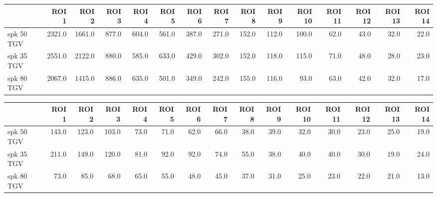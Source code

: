 \begin{tabular}{lrrrrrrrrrrrrrr}
\toprule
{} &   ROI 1 &   ROI 2 &  ROI 3 &  ROI 4 &  ROI 5 &  ROI 6 &  ROI 7 &  ROI 8 &  ROI 9 &  ROI 10 &  ROI 11 &  ROI 12 &  ROI 13 &  ROI 14 \\
\midrule
 spk 50 TGV &  2321.0 &  1661.0 &  877.0 &  604.0 &  561.0 &  387.0 &  271.0 &  152.0 &  112.0 &   100.0 &    62.0 &    43.0 &    32.0 &    22.0 \\
 spk 35 TGV &  2551.0 &  2122.0 &  880.0 &  585.0 &  633.0 &  429.0 &  302.0 &  152.0 &  118.0 &   115.0 &    71.0 &    48.0 &    28.0 &    23.0 \\
 spk 80 TGV &  2067.0 &  1415.0 &  886.0 &  635.0 &  501.0 &  349.0 &  242.0 &  155.0 &  116.0 &    93.0 &    63.0 &    42.0 &    32.0 &    17.0 \\
\bottomrule
\end{tabular}
\begin{tabular}{lrrrrrrrrrrrrrr}
\toprule
{} &  ROI 1 &  ROI 2 &  ROI 3 &  ROI 4 &  ROI 5 &  ROI 6 &  ROI 7 &  ROI 8 &  ROI 9 &  ROI 10 &  ROI 11 &  ROI 12 &  ROI 13 &  ROI 14 \\
\midrule
 spk 50 TGV &  143.0 &  123.0 &  103.0 &   73.0 &   71.0 &   62.0 &   66.0 &   38.0 &   39.0 &    32.0 &    30.0 &    23.0 &    25.0 &    19.0 \\
 spk 35 TGV &  211.0 &  149.0 &  120.0 &   81.0 &   92.0 &   92.0 &   74.0 &   55.0 &   38.0 &    40.0 &    40.0 &    30.0 &    19.0 &    24.0 \\
 spk 80 TGV &   73.0 &   85.0 &   68.0 &   65.0 &   55.0 &   48.0 &   45.0 &   37.0 &   31.0 &    25.0 &    23.0 &    22.0 &    21.0 &    13.0 \\
\bottomrule
\end{tabular}
